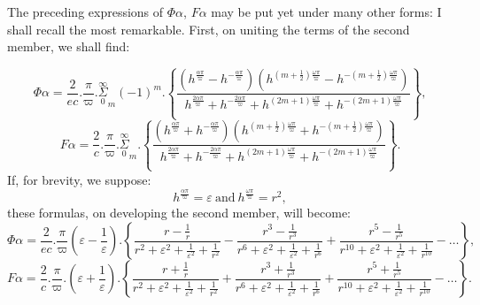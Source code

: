 \documentclass{article}
\begin{document}
The preceding expressions of $\Phi\alpha$, $F\alpha$ may be put yet under many other forms: I shall recall the most remarkable. First, on uniting the terms of the second member, we shall find:

\[
\Phi\alpha = \frac{2}{ec}.\frac{\pi}{\varpi}.\overset{\infty}{\underset{0}{\Sigma}}_{m}(-1)^{m}.\left\{\frac{\left(h^{\frac{\alpha\pi}{\varpi}}-h^{-\frac{\alpha\pi}{\varpi}}\right)\left(h^{(m+\frac{1}{2})\frac{\omega\pi}{\varpi}}-h^{-(m+\frac{1}{2})\frac{\omega\pi}{\varpi}}\right)}{h^{\frac{2\alpha\pi}{\varpi}}+h^{-\frac{2\alpha\pi}{\varpi}}+h^{(2m+1)\frac{\omega\pi}{\varpi}}+h^{-(2m+1)\frac{\omega\pi}{\varpi}}}\right\},
\tag{192.}
\]
\[
F\alpha = \frac{2}{c}.\frac{\pi}{\varpi}.\overset{\infty}{\underset{0}{\Sigma}}_{m}.\left\{\frac{\left(h^{\frac{\alpha\pi}{\varpi}}+h^{-\frac{\alpha\pi}{\varpi}}\right)\left(h^{(m+\frac{1}{2})\frac{\omega\pi}{\varpi}}+h^{-(m+\frac{1}{2})\frac{\omega\pi}{\varpi}}\right)}{h^{\frac{2\alpha\pi}{\varpi}}+h^{-\frac{2\alpha\pi}{\varpi}}+h^{(2m+1)\frac{\omega\pi}{\varpi}}+h^{-(2m+1)\frac{\omega\pi}{\varpi}}}\right\}.
\tag{193.}
\]
If, for brevity, we suppose:
\[
h^{\frac{\alpha\pi}{\varpi}} = \varepsilon\ \text{and}\ h^{\frac{\omega\pi}{\varpi}} = r^{2},
\tag{194.}
\]
these formulas, on developing the second member, will become:
\[
\Phi\alpha = \frac{2}{ec}.\frac{\pi}{\varpi}\left(\varepsilon-\frac{1}{\varepsilon}\right).\left\{\frac{r-\frac{1}{r}}{r^{2}+\varepsilon^{2}+\frac{1}{\varepsilon^{2}}+\frac{1}{r^{2}}}-\frac{r^{3}-\frac{1}{r^{3}}}{r^{6}+\varepsilon^{2}+\frac{1}{\varepsilon^{2}}+\frac{1}{r^{6}}}+\frac{r^{5}-\frac{1}{r^{5}}}{r^{10}+\varepsilon^{2}+\frac{1}{\varepsilon^{2}}+\frac{1}{r^{10}}}-\ldots\right\},
\tag{195.}
\]
\[
F\alpha = \frac{2}{c}.\frac{\pi}{\varpi}.\left(\varepsilon+\frac{1}{\varepsilon}\right).\left\{\frac{r+\frac{1}{r}}{r^{2}+\varepsilon^{2}+\frac{1}{\varepsilon^{2}}+\frac{1}{r^{2}}}+\frac{r^{3}+\frac{1}{r^{3}}}{r^{6}+\varepsilon^{2}+\frac{1}{\varepsilon^{2}}+\frac{1}{r^{6}}}+\frac{r^{5}+\frac{1}{r^{5}}}{r^{10}+\varepsilon^{2}+\frac{1}{\varepsilon^{2}}+\frac{1}{r^{10}}}-\ldots\right\}.
\tag{196.}
\]
\end{document}
